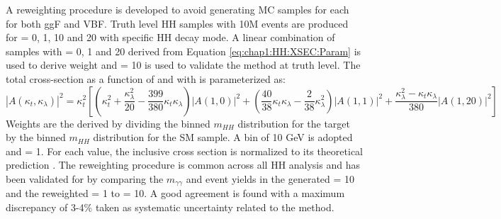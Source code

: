 A reweighting procedure is developed to avoid generating MC samples for each \kl for both ggF and VBF. Truth level HH samples with 10M events are produced for \kl= 0, 1, 10 and 20 with specific HH decay mode. A linear combination of samples with \kl= 0, 1 and 20 derived from Equation \ref{eq:chap1:HH:XSEC:Param} is used to derive weight and \kl= 10 is used to validate the method at truth level. The total cross-section as a function of \kl and \kt with is parameterized as:
\begin{equation}
    \left|A\left(\kappa_{t}, \kappa_{\lambda}\right)\right|^{2}=\kappa_{t}^{2}\left[\left(\kappa_{t}^{2}+\frac{\kappa_{\lambda}^{2}}{20}-\frac{399}{380} \kappa_{t} \kappa_{\lambda}\right)|A(1,0)|^{2}+\left(\frac{40}{38} \kappa_{t} \kappa_{\lambda}-\frac{2}{38} \kappa_{\lambda}^{2}\right)|A(1,1)|^{2}+\frac{\kappa_{\lambda}^{2}-\kappa_{t} \kappa_{\lambda}}{380}|A(1,20)|^{2}\right]
\end{equation}
Weights are the derived by dividing the binned $m_{HH}$ distribution for the target \kl by the binned $m_{HH}$ distribution for the SM sample. A bin of 10 GeV is adopted and \kt= 1. For each \kl value, the inclusive cross section is normalized to its theoretical prediction \cite{LHE}. The reweighting procedure is common across all HH analysis and has been validated for \HHyybb by comparing the $m_{\gamma\gamma}$ and event yields in the generated \kl= 10 and the reweighted \kl= 1 to \kl= 10. A good agreement is found with a maximum discrepancy of 3-4\% taken as systematic uncertainty related to the method.  \\ 

